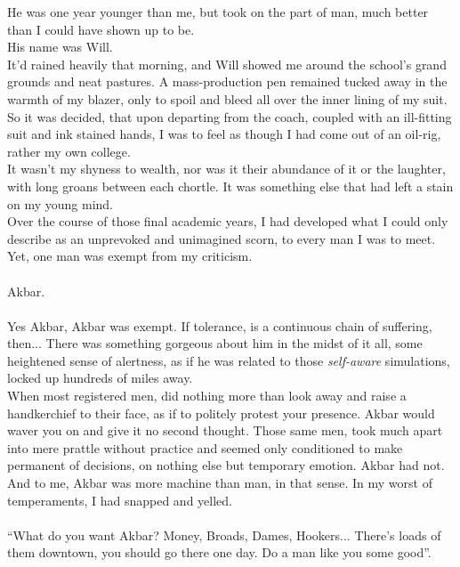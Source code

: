 \documentclass{book}
\begin{document}
{{He was one year younger than me, but took on the part of
man, much better than I could have shown up to be.\\
His name was Will. \\
It'd rained heavily that morning, and Will showed me around the school's
grand grounds and neat pastures. A mass-production pen
remained tucked away in the warmth of my blazer, only to
spoil and bleed all over the inner lining of my suit. So it was decided,
that upon departing from the coach, coupled with an ill-fitting
suit and ink stained hands, I was to feel as though
I had come out of an oil-rig, rather my own college.\\
It wasn't my shyness to wealth, nor was it their
abundance of it or the laughter, with long groans
between each chortle. It was something else that had left
a stain on my young mind.\\
Over the course of those final academic years, I had
developed what I could only describe as an unprevoked
and unimagined scorn, to every man I was to meet.\\
Yet, one man was exempt from my criticism.\\\\
Akbar.\\\\
Yes Akbar, Akbar was exempt.
If tolerance, is a continuous chain of suffering,
then... There was something gorgeous about him in
the midst of it all, some heightened sense of alertness,
as if he was related to those
\textit{self-aware} simulations, locked up hundreds of
miles away.\\
When most registered men, did nothing more
than look away and raise a handkerchief to their
face, as if to politely protest your presence.
Akbar would waver you on and give it no second thought.
Those same men, took much apart into mere prattle
without practice and seemed only conditioned
to make permanent of decisions, on nothing else
but temporary emotion. Akbar had not. And to me, Akbar was more machine than man, in that sense.
In my worst of temperaments, I had snapped and yelled.\\\\
``What do you want Akbar? Money, Broads, Dames, Hookers...
There's loads of them downtown, you should go there one day.
Do a man like you some good''.\\\\
}}
\end{document}
